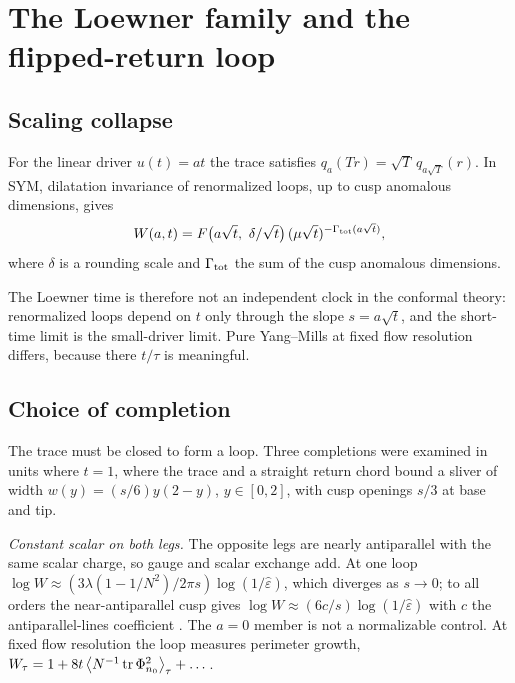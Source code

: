 \section{The Loewner family and the flipped-return loop}
\label{sec:loewner}

\subsection{Scaling collapse}

\begin{proposition}
\label{prop:collapse}
For the linear driver $u(t)=at$ the trace satisfies $q_a(Tr)=\sqrt T\,q_{a\sqrt T}(r)$. In \Nfour{} SYM,
dilatation invariance of renormalized loops, up to cusp anomalous dimensions, gives
\begin{equation}
W(a,t)=F\big(a\sqrt t,\ \delta/\sqrt t\big)\,(\mu\sqrt t)^{-\Gamma_{\rm tot}(a\sqrt t)},
\end{equation}
where $\delta$ is a rounding scale and $\Gamma_{\rm tot}$ the sum of the cusp anomalous dimensions.
\end{proposition}

The Loewner time is therefore not an independent clock in the conformal theory: renormalized loops depend
on $t$ only through the slope $s=a\sqrt t$, and the short-time limit is the small-driver limit. Pure
Yang--Mills at fixed flow resolution differs, because there $t/\tau$ is meaningful.

\subsection{Choice of completion}

The trace must be closed to form a loop. Three completions were examined in units where $t=1$, where the
trace and a straight return chord bound a sliver of width $w(y)=(s/6)y(2-y)$, $y\in[0,2]$, with cusp openings
$s/3$ at base and tip.

\emph{Constant scalar on both legs.} The opposite legs are nearly antiparallel with the same scalar charge, so
gauge and scalar exchange add. At one loop $\log W\approx(3\lambda(1-1/N^2)/2\pi s)\log(1/\hat\varepsilon)$,
which diverges as $s\to0$; to all orders the near-antiparallel cusp gives $\log W\approx(6c/s)\log(1/\hat\varepsilon)$
with $c$ the antiparallel-lines coefficient \cite{DrukkerForini}. The $a=0$ member is not a normalizable
control. At fixed flow resolution the loop measures perimeter growth, $W_\tau=1+8t\left\langle N^{-1}\operatorname{tr}\Phi_{n_0}^2\right\rangle_\tau+\dots$.

